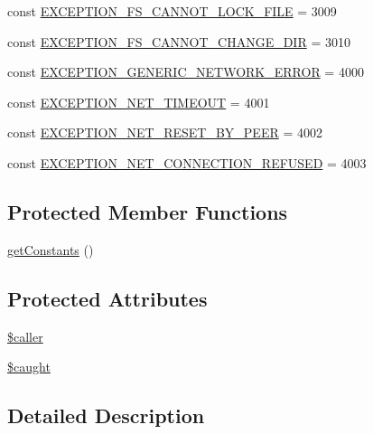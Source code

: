 \begin{DoxyCompactItemize}
const \hyperlink{class_database_exception_model_ac5a6423e46a25c86b58d3f6fb5b55c9d}{E\+X\+C\+E\+P\+T\+I\+O\+N\+\_\+\+F\+S\+\_\+\+C\+A\+N\+N\+O\+T\+\_\+\+L\+O\+C\+K\+\_\+\+F\+I\+L\+E} = 3009
\item 
const \hyperlink{class_database_exception_model_afb0b7d842c8de8754481a086fbaea08d}{E\+X\+C\+E\+P\+T\+I\+O\+N\+\_\+\+F\+S\+\_\+\+C\+A\+N\+N\+O\+T\+\_\+\+C\+H\+A\+N\+G\+E\+\_\+\+D\+I\+R} = 3010
\item 
const \hyperlink{class_database_exception_model_ab186397805d52a7001f613304dee257a}{E\+X\+C\+E\+P\+T\+I\+O\+N\+\_\+\+G\+E\+N\+E\+R\+I\+C\+\_\+\+N\+E\+T\+W\+O\+R\+K\+\_\+\+E\+R\+R\+O\+R} = 4000
\item 
const \hyperlink{class_database_exception_model_a53179a0bedcb9a50567afed3ae66baaa}{E\+X\+C\+E\+P\+T\+I\+O\+N\+\_\+\+N\+E\+T\+\_\+\+T\+I\+M\+E\+O\+U\+T} = 4001
\item 
const \hyperlink{class_database_exception_model_aaa5b45b9fc8dc9eaf84c2b846fbb9cc1}{E\+X\+C\+E\+P\+T\+I\+O\+N\+\_\+\+N\+E\+T\+\_\+\+R\+E\+S\+E\+T\+\_\+\+B\+Y\+\_\+\+P\+E\+E\+R} = 4002
\item 
const \hyperlink{class_database_exception_model_abbef5bf22fd6bb11a46837ba48e8bf00}{E\+X\+C\+E\+P\+T\+I\+O\+N\+\_\+\+N\+E\+T\+\_\+\+C\+O\+N\+N\+E\+C\+T\+I\+O\+N\+\_\+\+R\+E\+F\+U\+S\+E\+D} = 4003
\end{DoxyCompactItemize}
\subsection*{Protected Member Functions}
\begin{DoxyCompactItemize}
\item 
\hyperlink{class_database_exception_model_a37357ff7fe8d1c1ea764fa1465637543}{get\+Constants} ()
\end{DoxyCompactItemize}
\subsection*{Protected Attributes}
\begin{DoxyCompactItemize}
\item 
\hyperlink{class_database_exception_model_a0b21046130eb880a92ca750675597c75}{\$caller}
\item 
\hyperlink{class_database_exception_model_a461278c71fc5038037fac5e2f5e1c6af}{\$caught}
\end{DoxyCompactItemize}


\subsection{Detailed Description}


